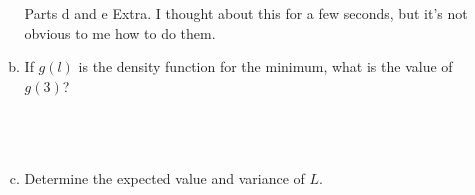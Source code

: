 \documentclass{scrartcl}
\begin{document}
\begin{enumerate}
\begin{enumerate}[a)]
    Parts d and e Extra. I thought about this for a few seconds, but it's not obvious to me how to do them.
  \item If $g(l)$ is the density function for the minimum, what is the value of $g(3)$?\\\ \\\ \\\ \\
    

  \item Determine the expected value and variance of $L$.
  \end{enumerate}
\end{enumerate}
\end{document}
